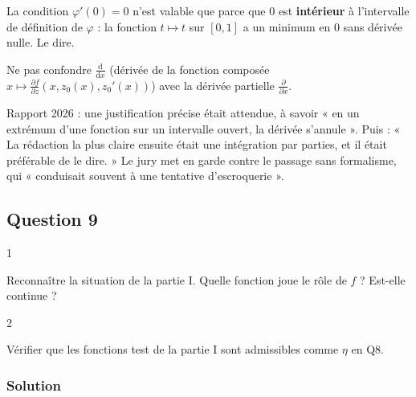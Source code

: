 \documentclass[11pt,a4paper]{article}
\begin{document}
\begin{piege}

La condition \(\varphi'(0)=0\) n'est valable que parce que \(0\) est \textbf{intérieur} à l'intervalle de définition de \(\varphi\) : la fonction \(t\mapsto t\) sur \([0,1]\) a un minimum en \(0\) sans dérivée nulle. Le dire.

\end{piege}

\begin{piege}

Ne pas confondre \(\frac{\mathrm d}{\mathrm dx}\) (dérivée de la fonction composée \(x\mapsto\frac{\partial f}{\partial z}(x,z_0(x),z_0'(x))\)) avec la dérivée partielle \(\frac{\partial}{\partial x}\).

\end{piege}

\begin{jury}

Rapport 2026 : une justification précise était attendue, à savoir « en un extrémum d'une fonction sur un intervalle ouvert, la dérivée s'annule ». Puis : « La rédaction la plus claire ensuite était une intégration par parties, et il était préférable de le dire. » Le jury met en garde contre le passage sans formalisme, qui « conduisait souvent à une tentative d'escroquerie ».

\end{jury}

\hypertarget{question-9}{%
\subsection{Question 9}\label{question-9}}

\begin{indication}{1}

Reconnaître la situation de la partie I. Quelle fonction joue le rôle de \(f\) ? Est-elle continue ?

\end{indication}

\begin{indication}{2}

Vérifier que les fonctions test de la partie I sont admissibles comme \(\eta\) en Q8.

\end{indication}

\hypertarget{solution-8}{%
\subsubsection{Solution}\label{solution-8}}
\end{document}
